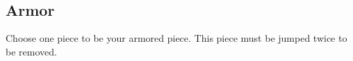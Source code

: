 \documentclass{article}
\begin{document}
\

\

\subsection*{Armor}

Choose one piece to be your armored piece.
This piece must be jumped twice to be removed.
\end{document}
